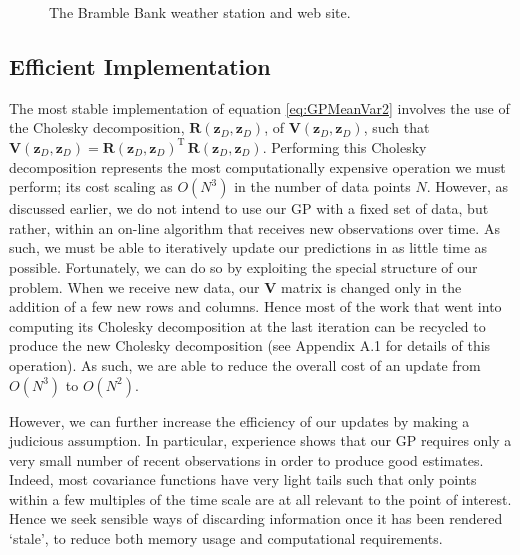 \documentclass{acmtrans2m}
\newcommand{\vect}[1]{\boldsymbol{#1}}
\newcommand{\vzD}{\vect{z}_D}
\newcommand{\mat}[1]{\mathbf{#1}}
\newcommand{\tr}{\mathrm{T}}
\DeclareMathOperator{\chol}{chol}
\begin{document}
\begin{figure}[tp!]
\begin{center}
 \hspace{0.25cm}
\caption{The Bramble Bank weather station and web site.}
\label{bramble_sensor}
\end{center}
\end{figure}

\subsection{Efficient Implementation}\label{sec_efficient}

\noindent The most stable implementation of equation \eqref{eq:GPMeanVar2} involves the use of the Cholesky decomposition, $\mat{R}(\vzD,\vzD)$, of $\mat{V}(\vzD,\vzD)$, such that $\mat{V}(\vzD,\vzD)=\mat{R}(\vzD,\vzD)^\tr\,\mat{R}(\vzD,\vzD)$. %
Performing this Cholesky decomposition represents the most computationally expensive operation we must perform; its cost scaling as $O(N^3)$ in the number of data points $N$. However, as discussed earlier, we do not intend to use our GP with a fixed set of data, but rather, within an on-line algorithm that receives new observations over time. As such, we must be able to iteratively update our predictions in as little time as possible. Fortunately, we can do so by exploiting the special structure of our problem. When we receive new data, our $\mat{V}$ matrix is changed only in the addition of a few new rows and columns. Hence most of the work that went into computing its Cholesky decomposition at the last iteration can be recycled to produce the new Cholesky decomposition (see Appendix A.1 for details of this operation). As such, we are able to reduce the overall cost of an update from $O(N^3)$ to $O(N^2)$.

However, we can further increase the efficiency of our updates by making a judicious assumption. In particular, experience shows that our GP requires only a very small number of recent observations in order to produce good estimates. Indeed, most covariance functions have very light tails such that only points within a few multiples of the time scale are at all relevant to the point of interest. Hence we seek sensible ways of discarding information once it has been rendered `stale', to reduce both memory usage and computational requirements.
\end{document}
